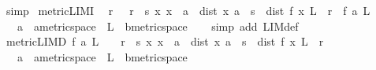 \begin{isabellebody}
\ simp%
\endisatagproof
{\isafoldproof}%
%
\isadelimproof
\isanewline
%
\endisadelimproof
\isanewline
{}\isamarkupfalse%
\ metric{\isacharunderscore}{\kern0pt}LIM{\isacharunderscore}{\kern0pt}I{\isacharcolon}{\kern0pt}\isanewline
\ \ {\isachardoublequoteopen}{\isacharparenleft}{\kern0pt}{\isasymAnd}r{\isachardot}{\kern0pt}\ {}\ {\isacharless}{\kern0pt}\ r\ {\isasymLongrightarrow}\ {\isasymexists}s{\isachargreater}{\kern0pt}{}{\isachardot}{\kern0pt}\ {\isasymforall}x{\isachardot}{\kern0pt}\ x\ {\isasymnoteq}\ a\ {\isasymand}\ dist\ x\ a\ {\isacharless}{\kern0pt}\ s\ {\isasymlongrightarrow}\ dist\ {\isacharparenleft}{\kern0pt}f\ x{\isacharparenright}{\kern0pt}\ L\ {\isacharless}{\kern0pt}\ r{\isacharparenright}{\kern0pt}\ {\isasymLongrightarrow}\ f\ {\isasymmidarrow}a{\isasymrightarrow}\ L{\isachardoublequoteclose}\isanewline
\ \ \ a\ {\isacharcolon}{\kern0pt}{\isacharcolon}{\kern0pt}\ {\isachardoublequoteopen}{\isacharprime}{\kern0pt}a{\isacharcolon}{\kern0pt}{\isacharcolon}{\kern0pt}metric{\isacharunderscore}{\kern0pt}space{\isachardoublequoteclose}\ \ L\ {\isacharcolon}{\kern0pt}{\isacharcolon}{\kern0pt}\ {\isachardoublequoteopen}{\isacharprime}{\kern0pt}b{\isacharcolon}{\kern0pt}{\isacharcolon}{\kern0pt}metric{\isacharunderscore}{\kern0pt}space{\isachardoublequoteclose}\isanewline
%
\isadelimproof
\ \ %
\endisadelimproof
%
\isatagproof
{}\isamarkupfalse%
\ {\isacharparenleft}{\kern0pt}simp\ add{\isacharcolon}{\kern0pt}\ LIM{\isacharunderscore}{\kern0pt}def{\isacharparenright}{\kern0pt}%
\endisatagproof
{\isafoldproof}%
%
\isadelimproof
\isanewline
%
\endisadelimproof
\isanewline
{}\isamarkupfalse%
\ metric{\isacharunderscore}{\kern0pt}LIM{\isacharunderscore}{\kern0pt}D{\isacharcolon}{\kern0pt}\ {\isachardoublequoteopen}f\ {\isasymmidarrow}a{\isasymrightarrow}\ L\ {\isasymLongrightarrow}\ {}\ {\isacharless}{\kern0pt}\ r\ {\isasymLongrightarrow}\ {\isasymexists}s{\isachargreater}{\kern0pt}{}{\isachardot}{\kern0pt}\ {\isasymforall}x{\isachardot}{\kern0pt}\ x\ {\isasymnoteq}\ a\ {\isasymand}\ dist\ x\ a\ {\isacharless}{\kern0pt}\ s\ {\isasymlongrightarrow}\ dist\ {\isacharparenleft}{\kern0pt}f\ x{\isacharparenright}{\kern0pt}\ L\ {\isacharless}{\kern0pt}\ r{\isachardoublequoteclose}\isanewline
\ \ \ a\ {\isacharcolon}{\kern0pt}{\isacharcolon}{\kern0pt}\ {\isachardoublequoteopen}{\isacharprime}{\kern0pt}a{\isacharcolon}{\kern0pt}{\isacharcolon}{\kern0pt}metric{\isacharunderscore}{\kern0pt}space{\isachardoublequoteclose}\ \ L\ {\isacharcolon}{\kern0pt}{\isacharcolon}{\kern0pt}\ {\isachardoublequoteopen}{\isacharprime}{\kern0pt}b{\isacharcolon}{\kern0pt}{\isacharcolon}{\kern0pt}metric{\isacharunderscore}{\kern0pt}space{\isachardoublequoteclose}\isanewline

\end{isabellebody}
